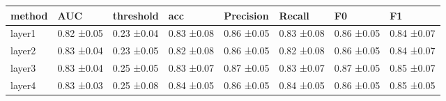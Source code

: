 \begin{tabular}{llllllll}
\toprule
method &        AUC &  threshold &        acc &  Precision &     Recall &         F0 &         F1 \\
\midrule
layer1 & 0.82 ±0.05 & 0.23 ±0.04 & 0.83 ±0.08 & 0.86 ±0.05 & 0.83 ±0.08 & 0.86 ±0.05 & 0.84 ±0.07 \\
layer2 & 0.83 ±0.04 & 0.23 ±0.05 & 0.82 ±0.08 & 0.86 ±0.05 & 0.82 ±0.08 & 0.86 ±0.05 & 0.84 ±0.07 \\
layer3 & 0.83 ±0.04 & 0.25 ±0.05 & 0.83 ±0.07 & 0.87 ±0.05 & 0.83 ±0.07 & 0.87 ±0.05 & 0.85 ±0.07 \\
layer4 & 0.83 ±0.03 & 0.25 ±0.08 & 0.84 ±0.05 & 0.86 ±0.05 & 0.84 ±0.05 & 0.86 ±0.05 & 0.85 ±0.05 \\
\bottomrule
\end{tabular}
